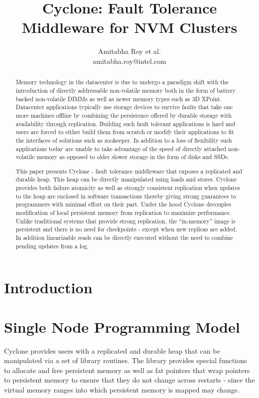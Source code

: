 \documentclass[twocolumn]{article}
\begin{document}
\title{Cyclone: Fault Tolerance Middleware for NVM Clusters}
\author{Amitabha Roy et al. \\ amitabha.roy@intel.com}
\maketitle
\begin{abstract}
Memory technology in the datacenter is due to undergo a paradigm shift with the
introduction of directly addressable non-volatile memory both in the form of
battery backed non-volatile DIMMs as well as newer memory types such as
3D XPoint. Datacenter applications typically use storage devices to survive
faults that take one more machines offline by combining the persistence offered by
durable storage with availability through replication. Building such fault
tolerant applications is hard and users are forced to either build
them from scratch or modify their applications to fit the interfaces of solutions
such as zookeeper. In addition to a loss of flexibility such applications today
are unable to take advantage of the speed of directly attached non-volatile
memory as opposed to older slower storage in the form of disks and SSDs.

This paper presents Cyclone - fault tolerance middleware that exposes a
replicated and durable heap. This heap can be directly manipulated using loads and
stores. Cyclone provides both failure atomicity as well as
strongly consistent replication when updates to the heap are enclosed in
software transactions thereby giving strong guarantees to programmers
with minimal effort on their part. Under the hood Cyclone decouples modification
of local persistent memory from replication to maximize performance. Unlike
traditional systems that provide strong replication, the ``in-memory'' image is
persistent and there is no need for checkpoints - except when new replicas are
added. In addition linearizable reads can be directly executed without the need to
combine pending updates from a log.
\end{abstract}  

\section{Introduction}

\section{Single Node Programming Model}
Cyclone provides users with a replicated and durable heap that can be
manipulated via a set of library routines. The library provides special
functions to allocate and free persistent memory as well as fat pointers that
wrap pointers to persistent memory to ensure that they do not change across
restarts - since the virtual memory ranges into which persistent memory is
mapped may change.
\end{document}
